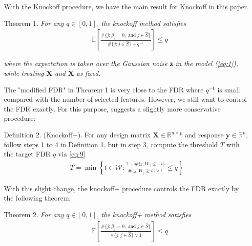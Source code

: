 \documentclass{uwstat572}
\begin{document}
With the Knockoff procedure, we have the main result for Knockoff in this paper.

{\sc Theorem 1. } {\it For any $q\in[0,1]$, the knockoff method satisfies }
\begin{align*}
& \mathbb{E}\left[\frac{\#\{j:\beta_j=0,\text{ and }j\in \hat{S} \}}{\#\{j:j\in \hat{S} \} + q^{-1}} \right]\leq q
\end{align*}

{\it where the expectation is taken over the Gaussian noise }\textbf{z} {\it in the model (\ref{eq:1}), while treating $\bm{X}$ and $\bm{\tilde{X}}$ as fixed. }

The "modified FDR" in Theorem 1 is very close to the FDR where $q^{-1}$ is small compared with the number of selected features. However, we still want to control the FDR exactly. For this purpose, \cite{barber2015controlling} suggests a slightly more conservative procedure:

{\sc Definition 2. }(Knockoff+). For any design matrix $\bm{X}\in\mathbb{R}^{n\times p}$ and response $\bm{y}\in \mathbb{R}^n$, 
follow steps 1 to 4 in {\sc Definition 1}, but in step 3, compute the threshold $T$ with the target FDR $q$ via \ref{eq:9}
\begin{align}\label{eq:9}
T  = \min\left\{t\in\mathcal{W}: \frac{1+\#\{j, W_j\leq -t\}}{\#\{j, W_j\geq t\}\vee 1}\leq q \right\}
\end{align}

With this slight change, the knockoff+ procedure controls the FDR exactly by the following theorem.

{\sc Theorem 2. } {\it For any $q\in[0,1]$, the knockoff+ method satisfies }
\begin{align*}
& \mathbb{E}\left[\frac{\#\{j:\beta_j=0,\text{ and }j\in \hat{S} \}}{\#\{j:j\in \hat{S} \}\vee 1} \right]\leq q
\end{align*}
\end{document}
